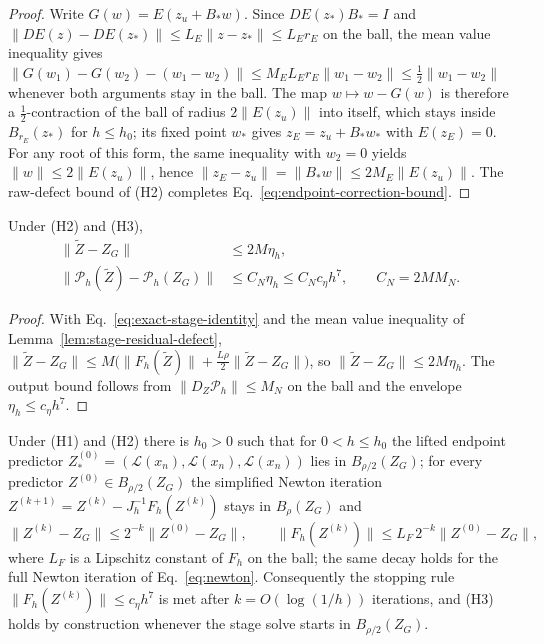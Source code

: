 \begin{proof}
Write $G(w)=E(z_u+B_\ast w)$. Since $DE(z_\ast)B_\ast=I$ and
$\|DE(z)-DE(z_\ast)\|\le L_E\|z-z_\ast\|\le L_Er_E$ on the ball, the mean value inequality gives
$\|G(w_1)-G(w_2)-(w_1-w_2)\|\le M_{E}L_Er_E\|w_1-w_2\|\le\tfrac12\|w_1-w_2\|$ whenever both
arguments stay in the ball. The map $w\mapsto w-G(w)$ is therefore a $\tfrac12$-contraction of the
ball of radius $2\|E(z_u)\|$ into itself, which stays inside $B_{r_E}(z_\ast)$ for $h\le h_0$; its
fixed point $w_\ast$ gives $z_E=z_u+B_\ast w_\ast$ with $E(z_E)=0$. For any root of this form, the
same inequality with $w_2=0$ yields $\|w\|\le2\|E(z_u)\|$, hence
$\|z_E-z_u\|=\|B_\ast w\|\le2M_{E}\|E(z_u)\|$. The raw-defect bound of (H2) completes
Eq.~\eqref{eq:endpoint-correction-bound}.
\end{proof}

\begin{lemma}
\label{lem:inexact-newton}
Under (H2) and (H3),
\begin{equation}
\label{eq:inexact-newton-stage-output-bounds}
\begin{aligned}
  \|\widetilde Z-Z_G\|&\le 2M\eta_h,\\
  \|\mathcal P_h(\widetilde Z)-\mathcal P_h(Z_G)\|&\le C_N\eta_h\le C_Nc_\eta h^7,\qquad C_N=2MM_N .
\end{aligned}
\end{equation}
\end{lemma}

\begin{proof}
With Eq.~\eqref{eq:exact-stage-identity} and the mean value inequality of
Lemma~\ref{lem:stage-residual-defect},
$\|\widetilde Z-Z_G\|\le M\bigl(\|F_h(\widetilde Z)\|+\tfrac{L\rho}{2}\|\widetilde Z-Z_G\|\bigr)$,
so $\|\widetilde Z-Z_G\|\le 2M\eta_h$. The output bound follows from $\|D_Z\mathcal P_h\|\le M_N$ on
the ball and the envelope $\eta_h\le c_\eta h^7$.
\end{proof}

\begin{lemma}
\label{lem:newton-envelope}
Under (H1) and (H2) there is $h_0>0$ such that for $0<h\le h_0$ the lifted endpoint predictor
$Z^{(0)}_\ast=(\mathcal L(x_n),\mathcal L(x_n),\mathcal L(x_n))$ lies in $B_{\rho/2}(Z_G)$; for
every predictor $Z^{(0)}\in B_{\rho/2}(Z_G)$ the simplified Newton iteration
$Z^{(k+1)}=Z^{(k)}-J_h^{-1}F_h(Z^{(k)})$ stays in $B_\rho(Z_G)$ and
\begin{equation}
  \|Z^{(k)}-Z_G\|\le 2^{-k}\|Z^{(0)}-Z_G\|,\qquad
  \|F_h(Z^{(k)})\|\le L_F\,2^{-k}\|Z^{(0)}-Z_G\| ,
  \label{eq:newton-envelope-decay}
\end{equation}
where $L_F$ is a Lipschitz constant of $F_h$ on the ball; the same decay holds for the full Newton
iteration of Eq.~\eqref{eq:newton}. Consequently the stopping rule $\|F_h(Z^{(k)})\|\le c_\eta h^7$
is met after $k=O(\log(1/h))$ iterations, and (H3) holds by construction whenever the stage solve
starts in $B_{\rho/2}(Z_G)$.
\end{lemma}

